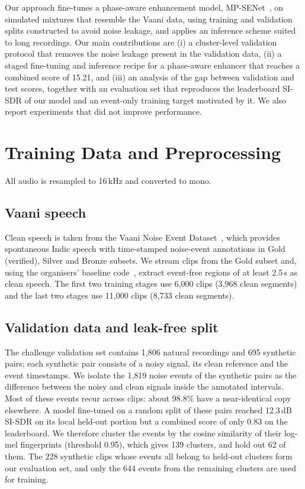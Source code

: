 \documentclass[conference]{IEEEtran}
\begin{document}
Our approach fine-tunes a phase-aware enhancement model, MP-SENet~\cite{lu2023mp}, on simulated mixtures that resemble the Vaani data, using training and validation splits constructed to avoid noise leakage, and applies an inference scheme suited to long recordings. Our main contributions are (i) a cluster-level validation protocol that removes the noise leakage present in the validation data, (ii) a staged fine-tuning and inference recipe for a phase-aware enhancer that reaches a combined score of 15.21, and (iii) an analysis of the gap between validation and test scores, together with an evaluation set that reproduces the leaderboard SI-SDR of our model and an event-only training target motivated by it. We also report experiments that did not improve performance.

\section{Training Data and Preprocessing}
All audio is resampled to 16\,kHz and converted to mono.

\subsection{Vaani speech}
Clean speech is taken from the Vaani Noise Event Dataset~\cite{basu2026vaani}, which provides spontaneous Indic speech with time-stamped noise-event annotations in Gold (verified), Silver and Bronze subsets. We stream clips from the Gold subset and, using the organisers' baseline code~\cite{nag2026baseline}, extract event-free regions of at least 2.5\,s as clean speech. The first two training stages use 6{,}000 clips (3{,}968 clean segments) and the last two stages use 11{,}000 clips (8{,}733 clean segments).

\subsection{Validation data and leak-free split}
The challenge validation set contains 1{,}806 natural recordings and 695 synthetic pairs; each synthetic pair consists of a noisy signal, its clean reference and the event timestamps. We isolate the 1{,}819 noise events of the synthetic pairs as the difference between the noisy and clean signals inside the annotated intervals. Most of these events recur across clips: about 98.8\% have a near-identical copy elsewhere. A model fine-tuned on a random split of these pairs reached 12.3\,dB \mbox{SI-SDR} on its local held-out portion but a combined score of only 0.83 on the leaderboard. We therefore cluster the events by the cosine similarity of their log-mel fingerprints (threshold 0.95), which gives 139 clusters, and hold out 62 of them. The 228 synthetic clips whose events all belong to held-out clusters form our evaluation set, and only the 644 events from the remaining clusters are used for training.
\end{document}
